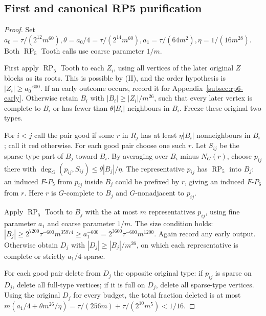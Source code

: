 \documentclass[11pt,a4paper]{article}
\theoremstyle{definition}
\theoremstyle{remark}
\numberwithin{equation}{section}
\begin{document}
\subsection{First and canonical RP5 purification}\label{subsec:rp6-first}
\begin{proof}
Set \(a_{0} = \tau/(2^{12} m^{60}),\allowbreak    \theta = a_{0}/4 = \tau/(2^{14} m^{60}),\allowbreak  a_{1} = \tau/(64m^{2}),\allowbreak       \eta = 1/(16m^{28})\). Both \(\operatorname{RP}_{5}\) Tooth calls use coarse parameter \(1/m\).

First apply \(\operatorname{RP}_{5}\) Tooth to each \(Z_{i}\), using all vertices of the later original \(Z\) blocks as its roots. This is possible by (II), and the order hypothesis is \(|Z_{i}|\ge\allowbreak a_{0}^{-600}\). If an early outcome occurs, record it for Appendix~\ref{subsec:rp6-early}. Otherwise retain \(B_{i}\) with \(|B_{i}|\ge\allowbreak |Z_{i}|/m^{26}\), such that every later vertex is complete to \(B_{i}\) or has fewer than \(\theta |B_{i}|\) neighbours in \(B_{i}\). Freeze these original two types.

For \(i<j\) call the pair good if some \(r\) in \(R_{j}\) has at least \(\eta |B_{i}|\) nonneighbours in \(B_{i}\); call it red otherwise. For each good pair choose one such \(r\). Let \(S_{ij}\) be the sparse-type part of \(B_{j}\) toward \(B_{i}\). By averaging over \(B_{i}\) minus \(N_{G}(r)\), choose \(p_{ij}\) there with \(\deg _{G}(p_{ij},\allowbreak S_{ij}) \le\allowbreak  \theta |B_{j}|/\eta\). The representative \(p_{ij}\) has \(\operatorname{RP}_{5}\) into \(B_{j}\): an induced \(F\text{-}P_{5}\) from \(p_{ij}\) inside \(B_{j}\) could be prefixed by \(r\), giving an induced \(F\text{-}P_{6}\) from \(r\). Here \(r\) is \(G\)-complete to \(B_{j}\) and \(G\)-nonadjacent to \(p_{ij}\).

Apply \(\operatorname{RP}_{5}\) Tooth to \(B_{j}\) with the at most \(m\) representatives \(p_{ij}\), using fine parameter \(a_{1}\) and coarse parameter \(1/m\). The size condition holds: \(|B_{j}| \ge\allowbreak  2^{7200} \tau^{-600} m^{35974} \ge\allowbreak  a_{1}^{-600} = 2^{3600} \tau^{-600} m^{1200}\). Again record any early output. Otherwise obtain \(D_{j}\) with \(|D_{j}|\ge\allowbreak |B_{j}|/m^{26}\), on which each representative is complete or strictly \(a_{1}/4\)-sparse.

For each good pair delete from \(D_{j}\) the opposite original type: if \(p_{ij}\) is sparse on \(D_{j}\), delete all full-type vertices; if it is full on \(D_{j}\), delete all sparse-type vertices. Using the original \(D_{j}\) for every budget, the total fraction deleted is at most \(m(a_{1}/4 + \theta m^{26}/\eta) = \tau/(256m) + \tau/(2^{10} m^{5}) < 1/16\).


\end{proof}
\end{document}
